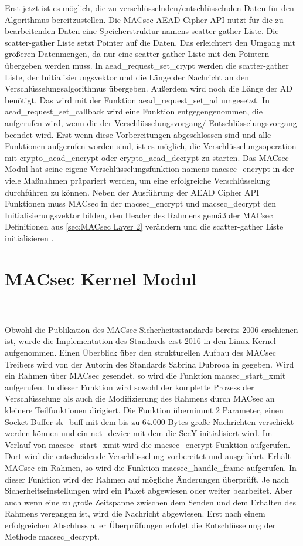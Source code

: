 Erst jetzt ist es möglich, die zu verschlüsselnden/entschlüsselnden Daten für den Algorithmus bereitzustellen. Die MACsec AEAD Cipher API nutzt für die zu bearbeitenden Daten eine Speicherstruktur namens scatter-gather Liste. Die scatter-gather Liste setzt Pointer auf die Daten. Das erleichtert den Umgang mit größeren Datenmengen, da nur eine scatter-gather Liste mit den Pointern übergeben werden muss.
In aead\_request\_set\_crypt werden die scatter-gather Liste, der Initialisierungsvektor und die Länge der Nachricht an den Verschlüsselungsalgorithmus übergeben. 
Außerdem wird noch die Länge der AD benötigt. Das wird mit der Funktion aead\_request\_set\_ad umgesetzt.
In aead\_request\_set\_callback wird eine Funktion entgegengenommen, die aufgerufen wird, wenn die der Verschlüsselungsvorgang/ Entschlüsselungsvorgang beendet wird.
Erst wenn diese Vorbereitungen abgeschlossen sind und alle Funktionen aufgerufen worden sind, ist es möglich, die Verschlüsselungsoperation mit crypto\_aead\_encrypt oder crypto\_aead\_decrypt zu starten.
Das MACsec Modul hat seine eigene Verschlüsselungsfunktion namens macsec\_encrypt in der viele Maßnahmen präpariert werden, um eine erfolgreiche Verschlüsselung durchführen zu können. Neben der Ausführung der AEAD Cipher API Funktionen muss MACsec in der macsec\_encrypt und macsec\_decrypt den Initialisierungsvektor bilden, den Header des Rahmens gemäß der MACsec Definitionen aus \ref{sec:MACsec Layer 2} verändern und die scatter-gather Liste initialisieren \cite{kerneldoc} \cite{mosnavcekoptimizing}.
\section{MACsec Kernel Modul}\\
\\
Obwohl die Publikation des MACsec Sicherheitsstandards bereits 2006 erschienen ist, wurde die Implementation des Standards  erst 2016 in den Linux-Kernel aufgenommen. Einen Überblick über den strukturellen Aufbau des \gls{MACsec} Treibers wird von der Autorin des Standards Sabrina Dubroca in \cite{dubroca} gegeben. Wird ein Rahmen über MACsec gesendet, so wird die Funktion macsec\_start\_xmit aufgerufen. In dieser Funktion wird sowohl der komplette Prozess der Verschlüsselung als auch die Modifizierung des Rahmens durch MACsec an kleinere Teilfunktionen dirigiert. Die Funktion übernimmt 2 Parameter, einen Socket Buffer sk\_buff mit dem bis zu 64.000 Bytes große Nachrichten verschickt werden können und ein net\_device mit dem die SecY initialisiert wird. Im Verlauf von macsec\_start\_xmit wird die macsec\_encrypt Funktion aufgerufen. Dort wird die entscheidende Verschlüsselung vorbereitet und ausgeführt.
Erhält \gls{MACsec} ein Rahmen, so wird die Funktion macsec\_handle\_frame aufgerufen. In dieser Funktion wird der Rahmen auf mögliche Änderungen überprüft. Je nach Sicherheitseinstellungen wird ein Paket abgewiesen oder weiter bearbeitet. Aber auch wenn eine zu große Zeitspanne zwischen dem Senden und dem Erhalten des Rahmens vergangen ist, wird die Nachricht abgewiesen. Erst nach einem erfolgreichen Abschluss aller Überprüfungen erfolgt die Entschlüsselung der Methode macsec\_decrypt.
